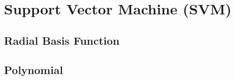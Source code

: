 \section{Support Vector Machine (SVM)}


\subsection{Radial Basis Function}





\subsection{Polynomial}




